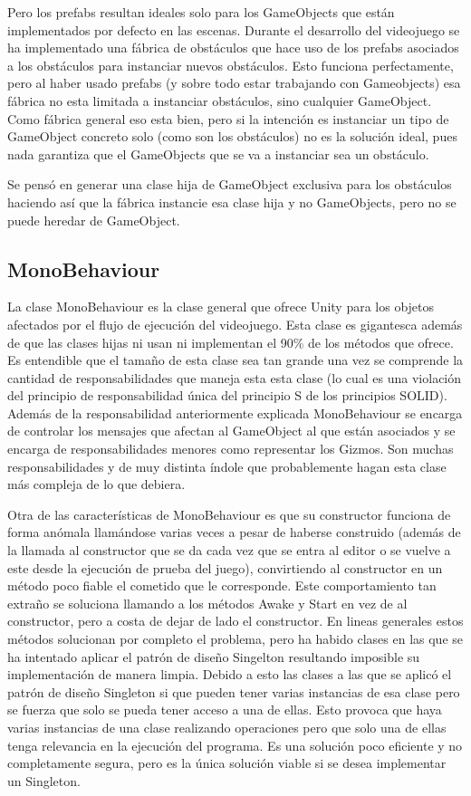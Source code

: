 Pero los prefabs resultan ideales solo para los GameObjects que están implementados por defecto en las escenas. Durante el desarrollo del videojuego se ha implementado una fábrica de obstáculos que hace uso de los prefabs asociados a los obstáculos para instanciar nuevos obstáculos. Esto funciona perfectamente, pero al haber usado prefabs (y sobre todo estar trabajando con Gameobjects) esa fábrica no esta limitada a instanciar obstáculos, sino cualquier GameObject. Como fábrica general eso esta bien, pero si la intención es instanciar un tipo de GameObject concreto solo (como son los obstáculos) no es la solución ideal, pues nada garantiza que el GameObjects que se va a instanciar sea un obstáculo.

Se pensó en generar una clase hija de GameObject exclusiva para los obstáculos haciendo así que la fábrica instancie esa clase hija y no GameObjects, pero no se puede heredar de GameObject.

\subsection{MonoBehaviour}
La clase MonoBehaviour es la clase general que ofrece Unity para los objetos afectados por el flujo de ejecución del videojuego. Esta clase es gigantesca además de que las clases hijas ni usan ni implementan el 90\% de los métodos que ofrece. Es entendible que el tamaño de esta clase sea tan grande una vez se comprende la cantidad de responsabilidades que maneja esta esta clase (lo cual es una violación del principio de responsabilidad única del principio S de los principios SOLID). Además de la responsabilidad anteriormente explicada MonoBehaviour se encarga de controlar los mensajes que afectan al GameObject al que están asociados y se encarga de responsabilidades menores como representar los Gizmos. Son muchas responsabilidades y de muy distinta índole que probablemente hagan esta clase más compleja de lo que debiera.

Otra de las características de MonoBehaviour es que su constructor funciona de forma anómala llamándose varias veces a pesar de haberse construido (además de la llamada al constructor que se da cada vez que se entra al editor o se vuelve a este desde la ejecución de prueba del juego), convirtiendo al constructor en un método poco fiable el cometido que le corresponde. Este comportamiento tan extraño se soluciona llamando a los métodos Awake y Start en vez de al constructor, pero a costa de dejar de lado el constructor. En lineas generales estos métodos solucionan por completo el problema, pero ha habido clases en las que se ha intentado aplicar el patrón de diseño Singelton resultando imposible su implementación de manera limpia. Debido a esto las clases a las que se aplicó el patrón de diseño Singleton si que pueden tener varias instancias de esa clase pero se fuerza que solo se pueda tener acceso a una de ellas. Esto provoca que haya varias instancias de una clase realizando operaciones pero que solo una de ellas tenga relevancia en la ejecución del programa. Es una solución poco eficiente y no completamente segura, pero es la única solución viable si se desea implementar un Singleton.

